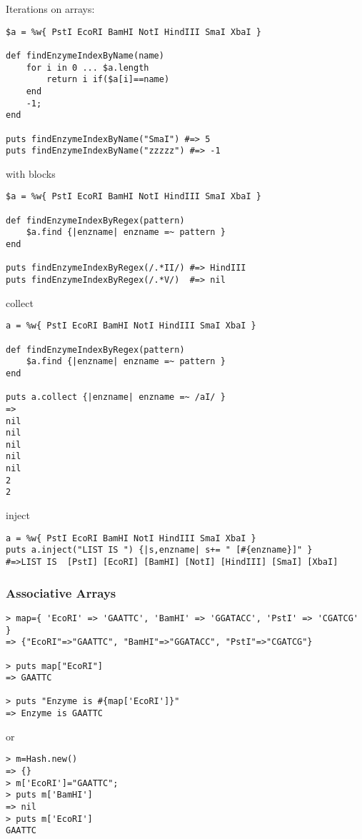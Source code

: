 \documentclass{article}
\begin{document}
Iterations on arrays:
\begin{lstlisting}
$a = %w{ PstI EcoRI BamHI NotI HindIII SmaI XbaI }

def findEnzymeIndexByName(name)
	for i in 0 ... $a.length
		return i if($a[i]==name) 
	end
	-1;
end

puts findEnzymeIndexByName("SmaI") #=> 5
puts findEnzymeIndexByName("zzzzz") #=> -1
\end{lstlisting}


with blocks
\begin{lstlisting}
$a = %w{ PstI EcoRI BamHI NotI HindIII SmaI XbaI }

def findEnzymeIndexByRegex(pattern)
	$a.find {|enzname| enzname =~ pattern }
end

puts findEnzymeIndexByRegex(/.*II/) #=> HindIII
puts findEnzymeIndexByRegex(/.*V/)  #=> nil
\end{lstlisting}

collect

\begin{lstlisting}
a = %w{ PstI EcoRI BamHI NotI HindIII SmaI XbaI }

def findEnzymeIndexByRegex(pattern)
	$a.find {|enzname| enzname =~ pattern }
end

puts a.collect {|enzname| enzname =~ /aI/ }
=>
nil
nil
nil
nil
nil
2
2
\end{lstlisting}

inject
\begin{lstlisting}
a = %w{ PstI EcoRI BamHI NotI HindIII SmaI XbaI }
puts a.inject("LIST IS ") {|s,enzname| s+= " [#{enzname}]" }
#=>LIST IS  [PstI] [EcoRI] [BamHI] [NotI] [HindIII] [SmaI] [XbaI]
\end{lstlisting}





\subsubsection{Associative Arrays}
\begin{lstlisting}
> map={ 'EcoRI' => 'GAATTC', 'BamHI' => 'GGATACC', 'PstI' => 'CGATCG' }
=> {"EcoRI"=>"GAATTC", "BamHI"=>"GGATACC", "PstI"=>"CGATCG"}

> puts map["EcoRI"]
=> GAATTC

> puts "Enzyme is #{map['EcoRI']}"
=> Enzyme is GAATTC
\end{lstlisting}

or

\begin{lstlisting}
> m=Hash.new()
=> {}
> m['EcoRI']="GAATTC";
> puts m['BamHI']
=> nil
> puts m['EcoRI']
GAATTC
\end{lstlisting}
\end{document}
